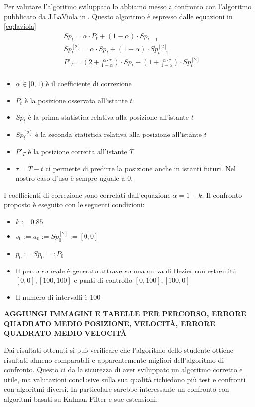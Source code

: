 Per valutare l'algoritmo sviluppato lo abbiamo messo a confronto con l'algoritmo pubblicato da J.LaViola in \cite{laviola}.
Questo algoritmo è espresso dalle equazioni in \ref{eq:laviola}
\begin{equation}
    \label{eq:laviola}
    \begin{split}
        & Sp_t = \alpha \cdot P_t + (1-\alpha) \cdot Sp_{t-1} \\
        & Sp^{[2]}_t = \alpha \cdot Sp_{t} + (1-\alpha) \cdot Sp^{[2]}_{t-1} \\
        & P'_T = \left(2 + \frac{\alpha \cdot \tau}{1 - \alpha}\right) \cdot Sp_t - \left(1 + \frac{\alpha \cdot \tau}{1 - \alpha}\right) \cdot Sp^{[2]}_t \\
    \end{split}
\end{equation}
\begin{itemize}
    \item $\alpha \in [0, 1)$ è il coefficiente di correzione
    \item $P_t$ è la posizione osservata all'istante $t$
    \item $Sp_t$ è la prima statistica relativa alla posizione all'istante $t$
    \item $Sp^{[2]}_t$ è la seconda statistica relativa alla posizione all'istante $t$
    \item $P'_T$ è la posizione corretta all'istante $T$
    \item $\tau = T - t$ ci permette di predirre la posizione anche in istanti futuri. Nel nostro caso d'uso è sempre uguale a 0.
\end{itemize}
I coefficienti di correzione sono correlati dall'equazione $\alpha = 1-k$.
Il confronto proposto è eseguito con le seguenti condizioni:
\begin{itemize}
    \item $k := 0.85$
    \item $v_0 := a_0 := Sp^{[2]}_0 := [0, 0]$
    \item $p_0 := Sp_0 =: P_0$
    \item Il percorso reale è generato attraverso una curva di Bezier con estremità $[0, 0], [100, 100]$ e punti di controllo $[0, 100], [100, 0]$
    \item Il numero di intervalli è $100$
\end{itemize}
\textbf{AGGIUNGI IMMAGINI E TABELLE PER PERCORSO, ERRORE QUADRATO MEDIO POSIZIONE, VELOCITÀ, ERRORE QUADRATO MEDIO VELOCITÀ}

Dai risultati ottenuti si può verificare che l'algoritmo dello studente ottiene risultati almeno comparabili e apparentemente migliori dell'algoritmo di confronto.
Questo ci da la sicurezza di aver sviluppato un algoritmo corretto e utile, ma valutazioni conclusive sulla sua qualità richiedono più test e confronti con algoritmi diversi.
In particolare sarebbe interessante un confronto con algoritmi basati su Kalman Filter e sue estensioni. 
